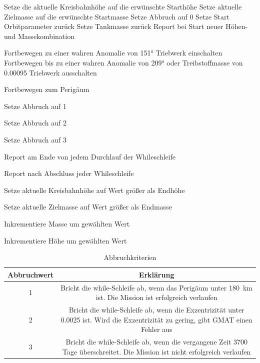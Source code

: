 \newpage
\begin{algorithmic}

\STATE Setze die aktuelle Kreisbahnhöhe auf die erwünschte Starthöhe
\STATE Setze aktuelle Zielmasse auf die erwünschte Startmasse
\STATE Setze Abbruch auf 0
\STATE Setze Start Orbitparameter zurück
\STATE Setze Tankmasse zurück
\RETURN Report bei Start neuer Höhen- und Massekombination


\STATE Fortbewegen zu einer wahren Anomalie von 151°
\STATE Triebwerk einschalten
\STATE Fortbewegen bis zu einer wahren Anomalie von 209° oder Treibstoffmasse von 0.00095 
\STATE Triebwerk ausschalten
\ENDIF

\STATE Fortbewegen zum Perigäum
\ENDIF

\STATE Setze Abbruch auf 1
\ENDIF

\STATE Setze Abbruch auf 2
\ENDIF

\STATE Setze Abbruch auf 3
\ENDIF

\RETURN Report am Ende von jedem Durchlauf der Whileschleife
\ENDWHILE

\RETURN Report nach Abschluss jeder Whileschleife


\STATE Setze aktuelle Kreisbahnhöhe auf Wert größer als Endhöhe 
\ENDIF

\STATE Setze aktuelle Zielmasse auf Wert größer als Endmasse
\ENDIF

\STATE Inkrementiere Masse um gewählten Wert
\ENDWHILE

\STATE Inkrementiere Höhe um gewählten Wert
\ENDWHILE


\end{algorithmic}
\newpage
\begin{center}
\begin{table}
\begin{tabular}{c|c{5cm}}
Abbruchwert & Erklärung \\
\hline \hline
\num{1} &  \multicolumn{2}{p{12cm}}{ Bricht die while-Schleife ab, wenn das Perigäum unter \SI{180}{\km} ist. Die Mission ist erfolgreich verlaufen}\\ \hline
\num{2} &  \multicolumn{2}{p{12cm}}{ Bricht die while-Schleife ab, wenn die Exzentrizität unter \num{0.0025} ist. Wird die Exzentrizität zu gering, gibt GMAT einen Fehler aus}\\  \hline
\num{3} &  \multicolumn{2}{p{12cm}}{ Bricht die while-Schleife ab, wenn die vergangene Zeit \num{3700} Tage überschreitet. Die Mission ist nicht erfolgreich verlaufen}\\  
\end{tabular}
\caption{Abbruchkriterien}
\label{Abbruchkrit}
\end{table}
\end{center}
